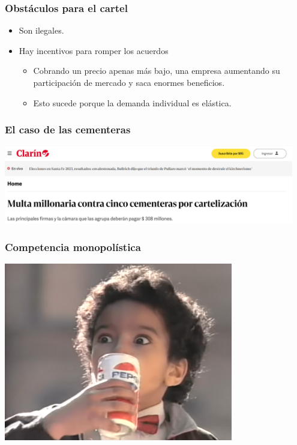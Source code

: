 \documentclass{beamer}
\begin{document}

\begin{frame}
\frametitle{Obstáculos para el cartel}
\begin{itemize}
    \item Son ilegales.\vspace{4mm}
    \item Hay incentivos para romper los acuerdos\vspace{2mm}
    \begin{itemize}
        \item Cobrando un precio apenas más bajo, una empresa aumentando su participación de mercado y saca enormes beneficios.\vspace{1mm}
        \item Esto sucede porque la demanda individual es elástica.
    \end{itemize}
\end{itemize}
\end{frame}

\begin{frame}
\frametitle{El caso de las cementeras}
\centering
\includegraphics[width=0.95\textwidth]{Slides Principios de Economia/Figures/Cartel.png}

\end{frame}

\begin{frame}
\frametitle{Competencia monopolística}
\begin{center}
  \href{https://www.youtube.com/watch?v=po0jY4WvCIc}{    \includegraphics[width=0.75\textwidth]{Slides Principios de Economia/Figures/Diferenciacion (1).png}}
\end{center}
\end{frame}
\end{document}
